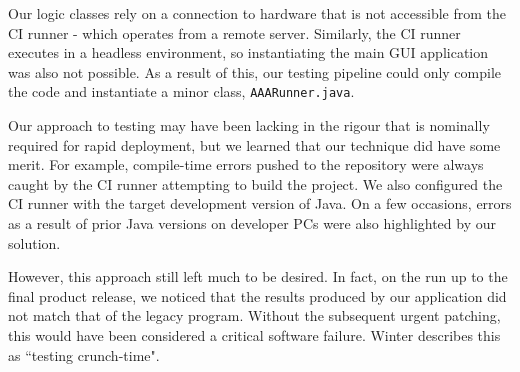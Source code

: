 \documentclass{l3proj}
\begin{document}
Our logic classes rely on a connection to hardware that is not accessible from the CI runner - which operates from a remote server. 
Similarly, the CI runner executes in a headless environment, so instantiating the main GUI application was also not possible. 
As a result of this, our testing pipeline could only compile the code and instantiate a minor class, \verb|AAARunner.java|. 

Our approach to testing may have been lacking in the rigour that is nominally required for rapid deployment, but we learned that our technique did have some merit. For example, compile-time errors pushed to the repository were always caught by the CI runner attempting to build the project. 
We also configured the CI runner with the target development version of Java. On a few occasions, errors as a result of prior Java versions on developer PCs were also highlighted by our solution. 

However, this approach still left much to be desired. In fact, on the run up to the final product release, we noticed that the results produced by our application did not match that of the legacy program. Without the subsequent urgent patching, this would have been considered a critical software failure. Winter describes this as ``testing crunch-time"\cite{winter}. 
\end{document}
